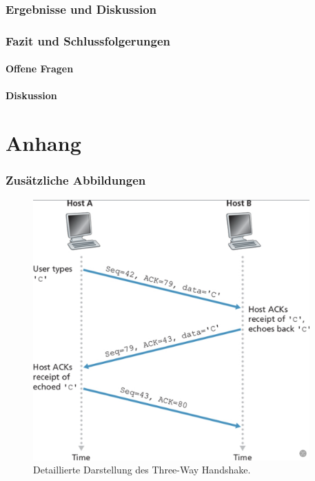 \documentclass[paper=a4,fontsize=12pt,ngerman]{scrartcl}
\begin{document}
\section{Ergebnisse und Diskussion}


\section{Fazit und Schlussfolgerungen}


\subsection{Offene Fragen}


\subsection{Diskussion}


\clearpage
\renewcommand\refname{Literaturverzeichnis}





\clearpage
\appendix
\part*{Anhang}


\section{Zusätzliche Abbildungen}

\begin{figure}[ht]
    \centering
    \includegraphics[height=10cm]{graphics/3way.png}
    \caption{Detaillierte Darstellung des Three-Way Handshake.}
    \label{fig:three-way handshake}
\end{figure}
\end{document}

